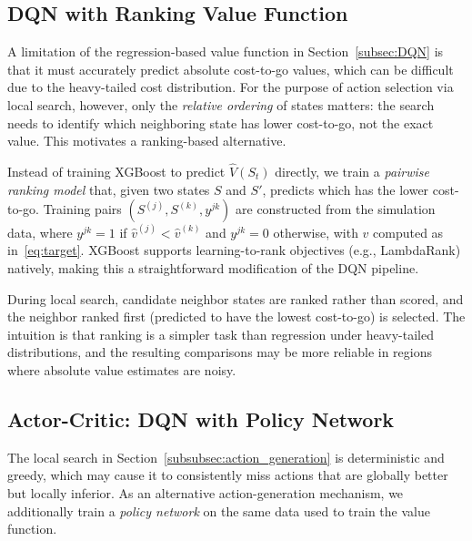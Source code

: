 \documentclass[3p, twocolumn]{elsarticle}
\begin{document}
\subsection{DQN with Ranking Value Function}
\label{subsec:DQN_rank}

A limitation of the regression-based value function in Section~\ref{subsec:DQN} is that it must accurately predict absolute cost-to-go values, which can be difficult due to the heavy-tailed cost distribution. For the purpose of action selection via local search, however, only the \emph{relative ordering} of states matters: the search needs to identify which neighboring state has lower cost-to-go, not the exact value. This motivates a ranking-based alternative.

Instead of training XGBoost to predict $\hat{V}(S_t)$ directly, we train a \emph{pairwise ranking model} that, given two states $S$ and $S'$, predicts which has the lower cost-to-go. Training pairs $(S^{(j)}, S^{(k)}, y^{jk})$ are constructed from the simulation data, where $y^{jk} = 1$ if $\hat{v}^{(j)} < \hat{v}^{(k)}$ and $y^{jk} = 0$ otherwise, with $\hat{v}$ computed as in~\eqref{eq:target}. XGBoost supports learning-to-rank objectives (e.g., LambdaRank) natively, making this a straightforward modification of the DQN pipeline.

During local search, candidate neighbor states are ranked rather than scored, and the neighbor ranked first (predicted to have the lowest cost-to-go) is selected. The intuition is that ranking is a simpler task than regression under heavy-tailed distributions, and the resulting comparisons may be more reliable in regions where absolute value estimates are noisy.

\subsection{Actor-Critic: DQN with Policy Network}
\label{subsec:DQN_actor}

The local search in Section~\ref{subsubsec:action_generation} is deterministic and greedy, which may cause it to consistently miss actions that are globally better but locally inferior. As an alternative action-generation mechanism, we additionally train a \emph{policy network} on the same data used to train the value function.
\end{document}
